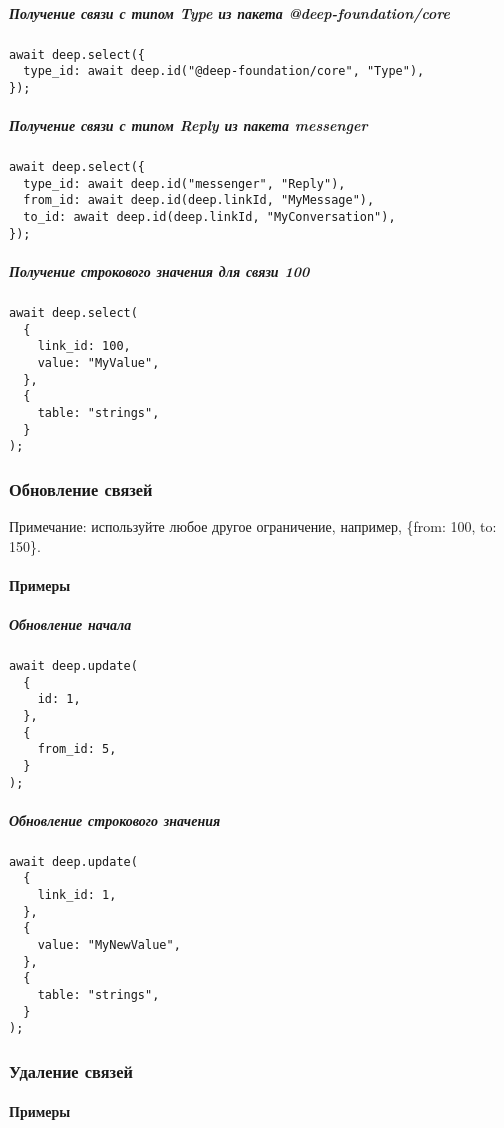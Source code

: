 \documentclass{article}
\begin{document}
\subparagraph{Получение связи с типом Type из пакета @deep-foundation/core}
\begin{lstlisting}
await deep.select({
  type_id: await deep.id("@deep-foundation/core", "Type"),
});
\end{lstlisting}

\subparagraph{Получение связи с типом Reply из пакета messenger}
\begin{lstlisting}
await deep.select({
  type_id: await deep.id("messenger", "Reply"),
  from_id: await deep.id(deep.linkId, "MyMessage"),
  to_id: await deep.id(deep.linkId, "MyConversation"),
});
\end{lstlisting}

\subparagraph{Получение строкового значения для связи 100}
\begin{lstlisting}
await deep.select(
  {
    link_id: 100,
    value: "MyValue",
  },
  {
    table: "strings",
  }
);
\end{lstlisting}

\subsubsection{Обновление связей}

Примечание: используйте любое другое ограничение, например, \{from: 100, to:
150\}.

\paragraph{Примеры}

\subparagraph{Обновление начала}
\begin{lstlisting}
await deep.update(
  {
    id: 1,
  },
  {
    from_id: 5,
  }
);
\end{lstlisting}

\subparagraph{Обновление строкового значения}
\begin{lstlisting}
await deep.update(
  {
    link_id: 1,
  },
  {
    value: "MyNewValue",
  },
  {
    table: "strings",
  }
);
\end{lstlisting}

\subsubsection{Удаление связей}

\paragraph{Примеры}
\end{document}
